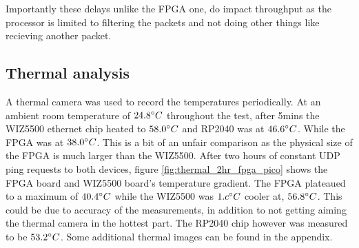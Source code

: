Importantly these delays unlike the FPGA one, do impact throughput as the processor is limited to filtering the packets and not doing other things like recieving another packet. 

\subsection{Thermal analysis}

A thermal camera was used to record the temperatures periodically. At an ambient room temperature of $24.8\degree C$ throughout the test, after 5mins the WIZ5500 ethernet chip heated to $58.0\degree C$ and RP2040 was at $46.6\degree C$. While the FPGA was at $38.0 \degree C$. This is a bit of an unfair comparison as the physical size of the FPGA is much larger than the WIZ5500. After two hours of constant UDP ping requests to both devices, figure \ref{fig:thermal_2hr_fpga_pico} shows the FPGA board and WIZ5500 board's temperature gradient. The FPGA plateaued to a maximum of $40.4 \degree C$ while the WIZ5500 was $1.c \degree C$ cooler at, $56.8 \degree C$. This could be due to accuracy of the measurements, in addition to not getting aiming the thermal camera in the hottest part. The RP2040 chip however was measured to be $53.2 \degree C$. Some additional thermal images can be found in the appendix. 



